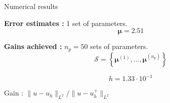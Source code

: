 \begin{frame}{Numerical results}
	\hspace{-5pt}\begin{minipage}[t]{0.46\linewidth}
		\textbf{Error estimates :} 1 set of parameters.
		$$\bm{\mu}=2.51$$
		\vspace{-35pt}
		\begin{figure}[H]
		\end{figure}
	\end{minipage} \qquad \small
	\begin{minipage}[t]{0.48\linewidth}
		\textbf{Gains achieved :} $n_p=50$ sets of parameters.
		$$\mathcal{S}=\left\{\bm{\mu}^{(1)},\dots,\bm{\mu}^{(n_p)}\right\}$$
		\vspace{-15pt}
		\begin{table}[H]
		\end{table}

		\normalsize\centering\vspace{-20pt}
		$$h=1.33\cdot 10^{-1}$$

		\vspace{-5pt}
		Gain : $\| u-u_h\|_{L^2} / \| u-u_h^+\|_{L^2}$ \\
		\end{minipage}
\end{frame}


